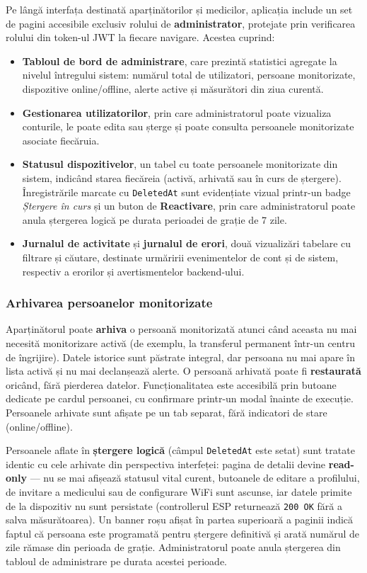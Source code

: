 \documentclass[12pt,a4paper,twoside]{article}
\begin{document}
Pe lângă interfața destinată aparținătorilor și medicilor, aplicația include un set de pagini accesibile exclusiv rolului de \textbf{administrator}, protejate prin verificarea rolului din token-ul JWT la fiecare navigare. Acestea cuprind:

\begin{itemize}[leftmargin=1.5em]
\item \textbf{Tabloul de bord de administrare}, care prezintă statistici agregate la nivelul întregului sistem: numărul total de utilizatori, persoane monitorizate, dispozitive online/offline, alerte active și măsurători din ziua curentă.
\item \textbf{Gestionarea utilizatorilor}, prin care administratorul poate vizualiza conturile, le poate edita sau șterge și poate consulta persoanele monitorizate asociate fiecăruia.
\item \textbf{Statusul dispozitivelor}, un tabel cu toate persoanele monitorizate din sistem, indicând starea fiecăreia (activă, arhivată sau în curs de ștergere). Înregistrările marcate cu \texttt{DeletedAt} sunt evidențiate vizual printr-un badge \textit{Ștergere în curs} și un buton de \textbf{Reactivare}, prin care administratorul poate anula ștergerea logică pe durata perioadei de grație de 7 zile.
\item \textbf{Jurnalul de activitate} și \textbf{jurnalul de erori}, două vizualizări tabelare cu filtrare și căutare, destinate urmăririi evenimentelor de cont și de sistem, respectiv a erorilor și avertismentelor backend-ului.
\end{itemize}

\subsubsection{Arhivarea persoanelor monitorizate}

Aparținătorul poate \textbf{arhiva} o persoană monitorizată atunci când aceasta nu mai necesită monitorizare activă (de exemplu, la transferul permanent într-un centru de îngrijire). Datele istorice sunt păstrate integral, dar persoana nu mai apare în lista activă și nu mai declanșează alerte. O persoană arhivată poate fi \textbf{restaurată} oricând, fără pierderea datelor. Funcționalitatea este accesibilă prin butoane dedicate pe cardul persoanei, cu confirmare printr-un modal înainte de execuție. Persoanele arhivate sunt afișate pe un tab separat, fără indicatori de stare (online/offline).

Persoanele aflate în \textbf{ștergere logică} (câmpul \texttt{DeletedAt} este setat) sunt tratate identic cu cele arhivate din perspectiva interfeței: pagina de detalii devine \textbf{read-only} — nu se mai afișează statusul vital curent, butoanele de editare a profilului, de invitare a medicului sau de configurare WiFi sunt ascunse, iar datele primite de la dispozitiv nu sunt persistate (controllerul ESP returnează \texttt{200 OK} fără a salva măsurătoarea). Un banner roșu afișat în partea superioară a paginii indică faptul că persoana este programată pentru ștergere definitivă și arată numărul de zile rămase din perioada de grație. Administratorul poate anula ștergerea din tabloul de administrare pe durata acestei perioade.
\end{document}
